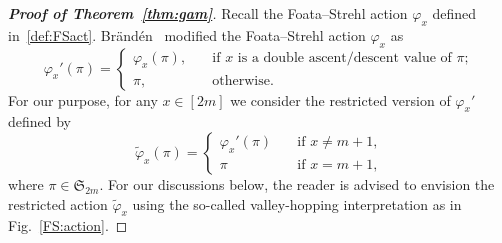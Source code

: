 \documentclass[11pt,reqno]{amsart}
\numberwithin{equation}{section}
\theoremstyle{plain}
\theoremstyle{definition}
\renewcommand{\S}{\mathfrak{S}}
\begin{document}
\begin{proof}[{\bf Proof of Theorem~\ref{thm:gam}}]  Recall the Foata--Strehl action $\varphi_x$ defined in~\eqref{def:FSact}. Br\"and\'en~\cite{Bra} modified the Foata--Strehl action $\varphi_x$ as
$$
\varphi_x'(\pi)=
\begin{cases}
\varphi_x(\pi),\quad&\text{if $x$ is a double ascent/descent value of $\pi$};\\
\pi, &\text{otherwise}.
\end{cases}
$$
For our purpose, for any $x\in[2m]$ we consider the restricted version of $\varphi_x'$ defined by
 $$
\widetilde\varphi_x(\pi)=
\begin{cases}
\varphi_x'(\pi)\quad&\text{if $x\neq m+1$},\\
\pi \quad&\text{if $x=m+1$},
\end{cases}
$$
 where $\pi\in\S_{2m}$. For our discussions below, the reader is advised to envision the restricted action $\widetilde\varphi_x$ using the so-called valley-hopping interpretation as in Fig.~\ref{FS:action}.


\end{proof}
\end{document}
